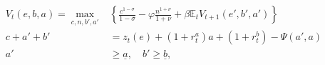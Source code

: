\begin{align} \tag{1}
    V_t(e, b, a) = \max_{c, n, b', a'} & \left\{\frac{c^{1-\sigma}}{1-\sigma} - \varphi \frac{n^{1+\nu}}{1+\nu} + \beta \mathbb{E}_t V_{t+1}(e', b', a') \right\}
    \\
    c + a' + b'                        & = z_t(e) + (1 + r_t^a)a + (1 + r_t^b) - \Psi(a', a)
    \\
    a'                                 & \geq \underline{a}, \quad b' \geq \underline{b},
\end{align}

